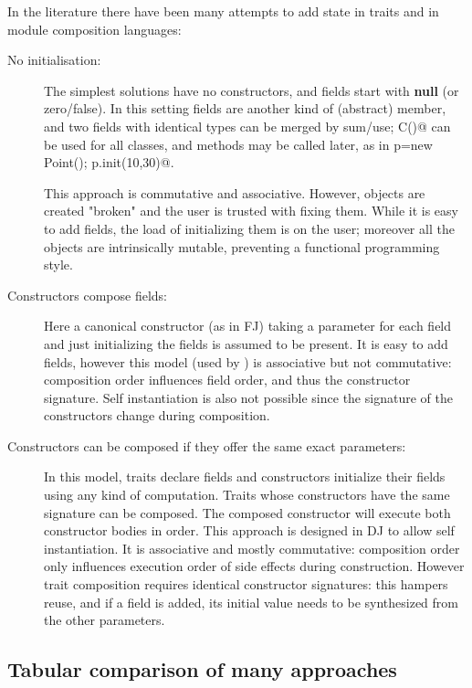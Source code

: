 In the literature there have been many attempts to add state in traits and in module composition languages:
\begin{description}  
\item[No initialisation:] The simplest solutions have no constructors, and fields start with \textbf{null} (or zero/false).
In this setting fields are another kind of (abstract) member, and two fields with identical types can be merged by sum/use; \Q@new C()@ can be used for all classes, and \Q@init@ methods may be called later, as in
  \Q@Point p=new Point(); p.init(10,30)@.
  
This approach is commutative and associative.
  However, objects are created "broken" and the user is trusted with fixing them.
  While it is easy to add fields, the load of initializing them is on the user; moreover
    all the objects are intrinsically mutable, preventing a functional programming style.
\item[Constructors compose fields:]
Here a canonical constructor (as in FJ) taking a parameter for each field and just initializing the fields is assumed to be present.
It is easy to add fields, however this model (used by \cite{fjig}) is associative but not commutative: composition order influences field order, and thus the constructor signature.
Self instantiation is also not possible 
since the signature of the constructors change during composition.


\item[Constructors can be composed if they offer the same exact parameters:]
In this model, traits declare fields and constructors initialize their fields using any kind of computation.
Traits whose constructors have the same signature can be composed.
The composed constructor will execute both constructor bodies in order.
This approach is designed in DJ to allow self instantiation.
It is associative and mostly commutative: composition order only influences execution order of side effects during construction.
However trait composition requires identical constructor signatures: this
hampers reuse, and if a field is added, its initial value needs to be
synthesized from the other parameters.
\end{description}

\subsection{Tabular comparison of many approaches}



